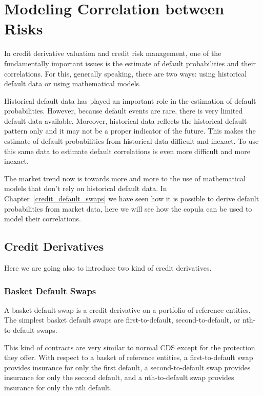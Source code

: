 \chapter{Modeling Correlation between Risks}

In credit derivative valuation and credit risk management, one of the
fundamentally important issues is the estimate of default
probabilities and their correlations. For this, generally speaking,
there are two ways: using historical default data or using mathematical
models.

Historical default data has played an important role in the estimation
of default probabilities. However, because default events are rare,
there is very limited default data available. Moreover, historical data
reflects the historical default pattern only and it may not be a proper
indicator of the future. This makes the estimate of default
probabilities from historical data difficult and inexact. To use this
same data to estimate default correlations is even more difficult and
more inexact.

The market trend now is towards more and more to the use of mathematical
models that don't rely on historical default data. In
Chapter~\ref{credit_default_swaps} we have seen how it is possible to derive default probabilities from market data, here we will see how the copula can be used to model their correlations. 

\section{Credit Derivatives}\label{credit-derivatives}
Here we are going also to introduce two kind of credit derivatives.

\subsection{Basket Default Swaps}\label{basket-default-swaps}

A basket default swap is a credit derivative on a portfolio of reference
entities. The simplest basket default swaps are first-to-default,
second-to-default, or nth-to-default swaps. 

This kind of contracts are very similar to normal CDS except for the protection they offer.
With respect to a basket of reference entities, a first-to-default swap provides insurance for only the first default, a second-to-default swap provides insurance
for only the second default, and a nth-to-default swap provides insurance
for only the nth default. 

